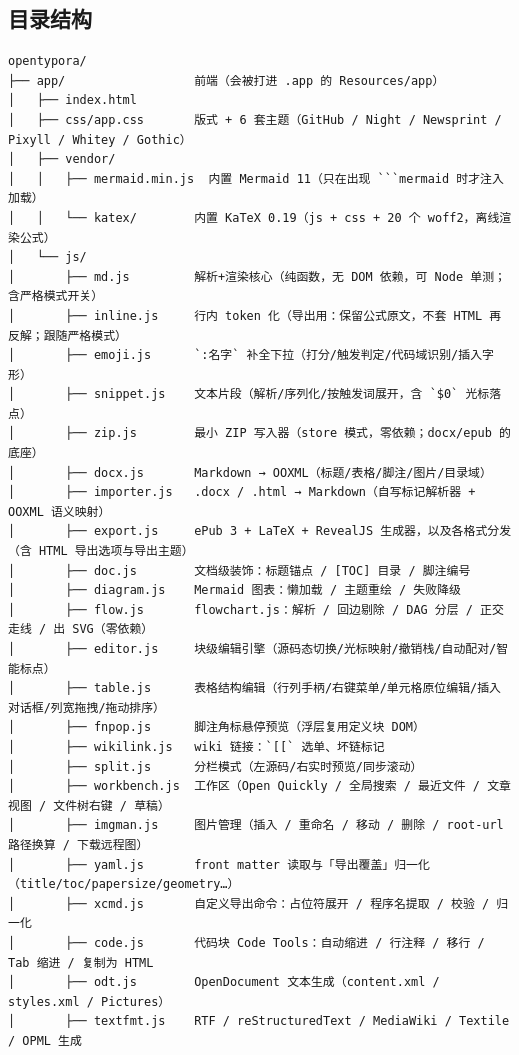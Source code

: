 \documentclass[11pt,a4paper]{ctexart}
\begin{document}
\subsection{目录结构}

\begin{verbatim}
opentypora/
├── app/                  前端（会被打进 .app 的 Resources/app）
│   ├── index.html
│   ├── css/app.css       版式 + 6 套主题（GitHub / Night / Newsprint / Pixyll / Whitey / Gothic）
│   ├── vendor/
│   │   ├── mermaid.min.js  内置 Mermaid 11（只在出现 ```mermaid 时才注入加载）
│   │   └── katex/        内置 KaTeX 0.19（js + css + 20 个 woff2，离线渲染公式）
│   └── js/
│       ├── md.js         解析+渲染核心（纯函数，无 DOM 依赖，可 Node 单测；含严格模式开关）
│       ├── inline.js     行内 token 化（导出用：保留公式原文，不套 HTML 再反解；跟随严格模式）
│       ├── emoji.js      `:名字` 补全下拉（打分/触发判定/代码域识别/插入字形）
│       ├── snippet.js    文本片段（解析/序列化/按触发词展开，含 `$0` 光标落点）
│       ├── zip.js        最小 ZIP 写入器（store 模式，零依赖；docx/epub 的底座）
│       ├── docx.js       Markdown → OOXML（标题/表格/脚注/图片/目录域）
│       ├── importer.js   .docx / .html → Markdown（自写标记解析器 + OOXML 语义映射）
│       ├── export.js     ePub 3 + LaTeX + RevealJS 生成器，以及各格式分发（含 HTML 导出选项与导出主题）
│       ├── doc.js        文档级装饰：标题锚点 / [TOC] 目录 / 脚注编号
│       ├── diagram.js    Mermaid 图表：懒加载 / 主题重绘 / 失败降级
│       ├── flow.js       flowchart.js：解析 / 回边剔除 / DAG 分层 / 正交走线 / 出 SVG（零依赖）
│       ├── editor.js     块级编辑引擎（源码态切换/光标映射/撤销栈/自动配对/智能标点）
│       ├── table.js      表格结构编辑（行列手柄/右键菜单/单元格原位编辑/插入对话框/列宽拖拽/拖动排序）
│       ├── fnpop.js      脚注角标悬停预览（浮层复用定义块 DOM）
│       ├── wikilink.js   wiki 链接：`[[` 选单、坏链标记
│       ├── split.js      分栏模式（左源码/右实时预览/同步滚动）
│       ├── workbench.js  工作区（Open Quickly / 全局搜索 / 最近文件 / 文章视图 / 文件树右键 / 草稿）
│       ├── imgman.js     图片管理（插入 / 重命名 / 移动 / 删除 / root-url 路径换算 / 下载远程图）
│       ├── yaml.js       front matter 读取与「导出覆盖」归一化（title/toc/papersize/geometry…）
│       ├── xcmd.js       自定义导出命令：占位符展开 / 程序名提取 / 校验 / 归一化
│       ├── code.js       代码块 Code Tools：自动缩进 / 行注释 / 移行 / Tab 缩进 / 复制为 HTML
│       ├── odt.js        OpenDocument 文本生成（content.xml / styles.xml / Pictures）
│       ├── textfmt.js    RTF / reStructuredText / MediaWiki / Textile / OPML 生成

\end{verbatim}
\end{document}
